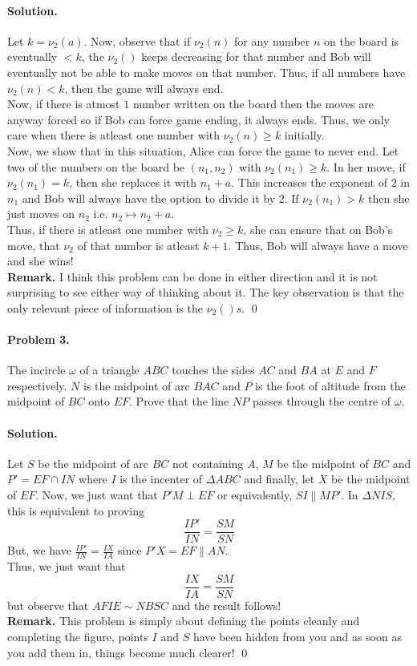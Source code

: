 \documentclass[12pt]{article}
\newenvironment{solution}
{\paragraph{Solution.}}
{\qed\eject}
\begin{document}
\begin{solution}
    Let $k=\nu_2(a)$. Now, observe that if $\nu_2(n)$ for any number $n$ on the board is eventually $<k$, the $\nu_2()$ keeps decreasing for that number and Bob will eventually not be able to make moves on that number. Thus, if all numbers have $\nu_2(n)<k$, then the game will always end.\\

    Now, if there is atmost $1$ number written on the board then the moves are anyway forced so if Bob can force game ending, it always ends. Thus, we only care when there is atleast one number with $\nu_2(n)\ge k$ initially.\\

    Now, we show that in this situation, Alice can force the game to never end. Let two of the numbers on the board be $(n_1,n_2)$ with $\nu_2(n_1)\ge k$. In her move, if $\nu_2(n_1)=k$, then she replaces it with $n_1+a$. This increases the exponent of $2$ in $n_1$ and Bob will always have the option to divide it by $2$. If $\nu_2(n_1)>k$ then she just moves on $n_2$ i.e. $n_2\mapsto n_2+a$.\\ 

    Thus, if there is atleast one number with $\nu_2\ge k$, she can ensure that on Bob's move, that $\nu_2$ of that number is atleast $k+1$. Thus, Bob will always have a move and she wins!\\

    \textbf{Remark.} I think this problem can be done in either direction and it is not surprising to see either way of thinking about it. The key observation is that the only relevant piece of information is the $\nu_2()s$.
\end{solution}

\paragraph{\textbf{Problem 3.}} The incircle $\omega$ of a triangle $ABC$ touches the sides $AC$ and $BA$ at $E$ and $F$ respectively. $N$ is the midpoint of arc $BAC$ and $P$ is the foot of altitude from the midpoint of $BC$ onto $EF$. Prove that the line $NP$ passes through the centre of $\omega$.

\begin{solution}
    Let $S$ be the midpoint of arc $BC$ not containing $A$, $M$ be the midpoint of $BC$ and $P'=EF\cap IN$ where $I$ is the incenter of $\Delta ABC$ and finally, let $X$ be the midpoint of $EF$. Now, we just want that $P'M\perp EF$ or equivalently, $SI\parallel MP'$. In $\Delta NIS$, this is equivalent to proving \[\frac{IP'}{IN}=\frac{SM}{SN}\]
    But, we have $\frac{IP'}{IN}=\frac{IX}{IA}$ since $P'X=EF\parallel AN$.\\
    
    Thus, we just want that \[\frac{IX}{IA}=\frac{SM}{SN}\] but observe that $AFIE\sim NBSC$ and the result follows!\\

    \textbf{Remark.} This problem is simply about defining the points cleanly and completing the figure, points $I$ and $S$ have been hidden from you and as soon as you add them in, things become much clearer!
\end{solution}
\end{document}
